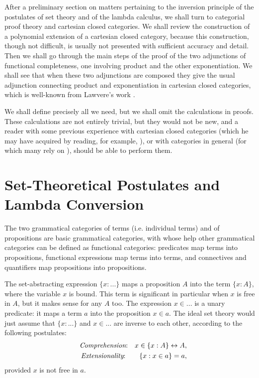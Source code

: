 \documentclass[12pt]{article}
\begin{document}
After a preliminary section on matters pertaining to the inversion principle
of the postulates of set theory and of the lambda calculus, we shall turn to
categorial proof theory and cartesian closed categories. We shall review the
construction of a polynomial extension of a cartesian closed category,
because this construction, though not difficult, is usually not presented
with sufficient accuracy and detail. Then we shall go through the main steps
of the proof of the two adjunctions of functional completeness, one
involving product and the other exponentiation. We shall see that when these
two adjunctions are composed they give the usual adjunction connecting
product and exponentiation in cartesian closed categories, which is
well-known from Lawvere's work \cite{Law69}.

We shall define precisely all we need, but we shall omit the calculations in
proofs. These calculations are not entirely trivial, but they would not be
new, and a reader with some previous experience with cartesian closed
categories (which he may have acquired by reading, for example, \cite{LS86}%
), or with categories in general (for which many rely on \cite{McL71}),
should be able to perform them.

\section{Set-Theoretical Postulates and Lambda Conversion}

\noindent The two grammatical categories of terms (i.e. individual terms)
and of propositions are basic grammatical categories, with whose help other
grammatical categories can be defined as functional categories: predicates
map terms into propositions, functional expressions map terms into terms,
and connectives and quantifiers map propositions into propositions.

The set-abstracting expression $\{x:...\}$ maps a proposition $A$ into the
term $\{x:A\}$, where the variable $x$ is bound. This term is significant in
particular when $x$ is free in $A$, but it makes sense for any $A$ too. The
expression $x\in ...$ is a unary predicate: it maps a term $a$ into the
proposition $x\in a$. The ideal set theory would just assume that $\{x:...\}$
and $x\in ...$ are inverse to each other, according to the following
postulates: 
\begin{eqnarray*}
&&\text{{\it Comprehension}:\quad }x\in \{x:A\}\leftrightarrow A, \\
&&\text{{\it Extensionality}:\qquad }\{x:x\in a\}=a,
\end{eqnarray*}
provided $x$ is not free in $a$.
\end{document}
